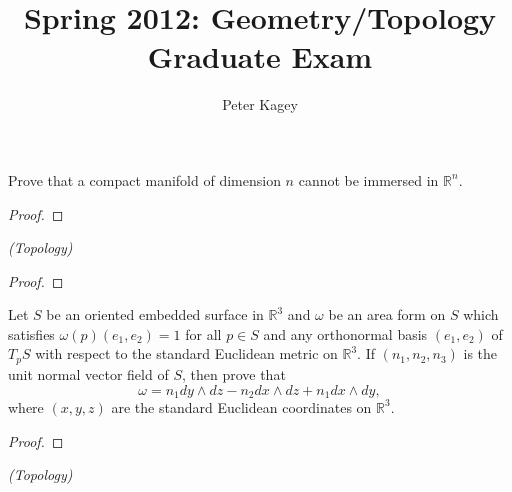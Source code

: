 \documentclass{article}
\newenvironment{problem}[2][Problem]{\begin{trivlist}
\item[\hskip \labelsep {\bfseries #1}\hskip \labelsep {\bfseries #2.}]}{\end{trivlist}}
\begin{document}
\title{Spring 2012: Geometry/Topology Graduate Exam}
\author{Peter Kagey}

\maketitle

\begin{problem}{1}
  Prove that a compact manifold of dimension $n$ cannot be immersed in
  $\mathbb{R}^n$.
\end{problem}

\begin{proof}
\end{proof}

\pagebreak

\begin{problem}{2} \textit{(Topology)}
\end{problem}

\begin{proof}
\end{proof}

\pagebreak

\begin{problem}{3}
  Let $S$ be an oriented embedded surface in $\mathbb{R}^3$ and $\omega$ be an
  area form on $S$ which satisfies $\omega(p)(e_1, e_2) = 1$ for all $p \in S$
  and any orthonormal basis $(e_1, e_2)$ of $T_pS$ with respect to the standard
  Euclidean metric on $\mathbb{R}^3$. If $(n_1, n_2, n_3)$ is the unit normal
  vector field of $S$, then prove that \[
    \omega = n_1 dy \wedge dz - n_2 dx \wedge dz + n_1 dx \wedge dy,
  \] where $(x, y, z)$ are the standard Euclidean coordinates on $\mathbb{R}^3$.
\end{problem}

\begin{proof}
\end{proof}

\pagebreak

\begin{problem}{4} \textit{(Topology)}
\end{problem}
\end{document}
